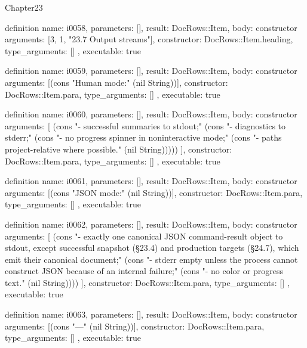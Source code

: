 \begin{lexlean}{Chapter23}
\begin{semanticmodule}
definition{
  name: i0058,
  parameters: [],
  result: DocRows::Item,
  body: constructor{
    arguments: [3, 1, "23.7 Output streams"],
    constructor: DocRows::Item.heading,
    type_arguments: []
  },
  executable: true
}

definition{
  name: i0059,
  parameters: [],
  result: DocRows::Item,
  body: constructor{
    arguments: [(cons "Human mode:" (nil String))],
    constructor: DocRows::Item.para,
    type_arguments: []
  },
  executable: true
}

definition{
  name: i0060,
  parameters: [],
  result: DocRows::Item,
  body: constructor{
    arguments: [
      (cons "- successful summaries to stdout;" (cons "- diagnostics to stderr;" (cons "- no progress spinner in noninteractive mode;" (cons "- paths project-relative where possible." (nil String)))))
    ],
    constructor: DocRows::Item.para,
    type_arguments: []
  },
  executable: true
}

definition{
  name: i0061,
  parameters: [],
  result: DocRows::Item,
  body: constructor{
    arguments: [(cons "JSON mode:" (nil String))],
    constructor: DocRows::Item.para,
    type_arguments: []
  },
  executable: true
}

definition{
  name: i0062,
  parameters: [],
  result: DocRows::Item,
  body: constructor{
    arguments: [
      (cons "- exactly one canonical JSON command-result object to stdout, except successful snapshot (§23.4) and production targets (§24.7), which emit their canonical document;" (cons "- stderr empty unless the process cannot construct JSON because of an internal failure;" (cons "- no color or progress text." (nil String))))
    ],
    constructor: DocRows::Item.para,
    type_arguments: []
  },
  executable: true
}

definition{
  name: i0063,
  parameters: [],
  result: DocRows::Item,
  body: constructor{
    arguments: [(cons "---" (nil String))],
    constructor: DocRows::Item.para,
    type_arguments: []
  },
  executable: true
}
\end{semanticmodule}
\end{lexlean}

